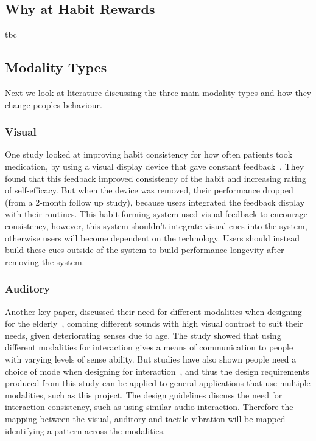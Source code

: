 \subsection{Why at Habit Rewards}
tbc

\subsection{Modality Types}
Next we look at literature discussing the three main modality types and how they change peoples behaviour.

\subsubsection*{Visual}
One study looked at improving habit consistency for how often patients took medication,
by using a visual display device that gave constant feedback~\cite{article_realtime_feedback_improving_medication_taking}.
They found that this feedback improved consistency of the habit and increasing rating of self-efficacy.
But when the device was removed, their performance dropped (from a 2-month follow up study), because users integrated the feedback display with their routines.
This habit-forming system used visual feedback to encourage consistency, however, this system shouldn't integrate visual cues into the system, otherwise users will become dependent on the technology.
Users should instead build these cues outside of the system to build performance longevity after removing the system.

\subsubsection*{Auditory}
Another key paper, discussed their need for different modalities when designing for the elderly~\cite{article_movipill_improving_medication_elders},
combing different sounds with high visual contrast to suit their needs, given deteriorating senses due to age.
The study showed that using different modalities for interaction gives a means of communication to people with varying levels of sense ability.
But studies have also shown people need a choice of mode when designing for interaction~\cite{article_user_centred_multimodal_reminders},
and thus the design requirements produced from this study can be applied to general applications that use multiple modalities, such as this project.
The design guidelines discuss the need for interaction consistency, such as using similar audio interaction.
Therefore the mapping between the visual, auditory and tactile vibration will be mapped identifying a pattern across the modalities.

